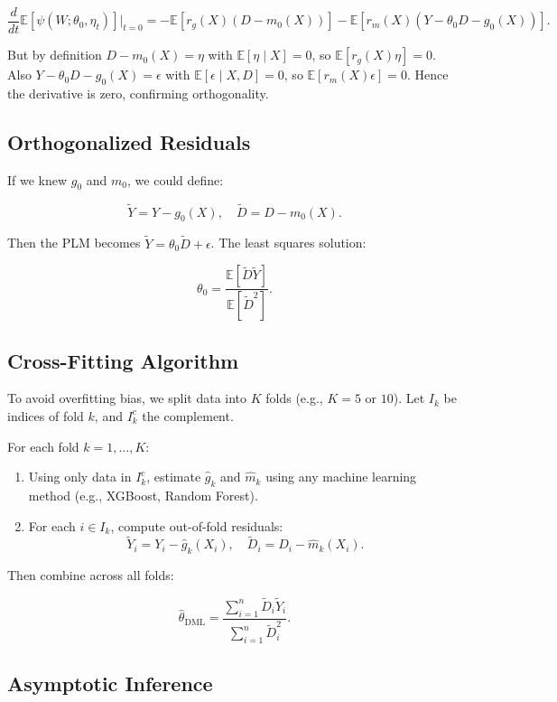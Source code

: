 \documentclass[12pt]{article}
\begin{document}
	\[
	\frac{d}{dt} \mathbb{E}[\psi(W; \theta_0, \eta_t)] \big|_{t=0} = -\mathbb{E}[r_g(X)(D - m_0(X))] - \mathbb{E}[r_m(X)(Y - \theta_0 D - g_0(X))].
	\]
	
	But by definition $D - m_0(X) = \eta$ with $\mathbb{E}[\eta \mid X] = 0$, so $\mathbb{E}[r_g(X) \eta] = 0$. Also $Y - \theta_0 D - g_0(X) = \epsilon$ with $\mathbb{E}[\epsilon \mid X, D] = 0$, so $\mathbb{E}[r_m(X) \epsilon] = 0$. Hence the derivative is zero, confirming orthogonality.
	
	\subsection{Orthogonalized Residuals}
	
	If we knew $g_0$ and $m_0$, we could define:
	
	\[
	\tilde{Y} = Y - g_0(X), \quad \tilde{D} = D - m_0(X).
	\]
	
	Then the PLM becomes $\tilde{Y} = \theta_0 \tilde{D} + \epsilon$. The least squares solution:
	
	\[
	\theta_0 = \frac{\mathbb{E}[\tilde{D} \tilde{Y}]}{\mathbb{E}[\tilde{D}^2]}.
	\]
	
	\subsection{Cross-Fitting Algorithm}
	
	To avoid overfitting bias, we split data into $K$ folds (e.g., $K=5$ or $10$). Let $I_k$ be indices of fold $k$, and $I_k^c$ the complement.
	
	For each fold $k=1,\dots,K$:
	
	\begin{enumerate}
		\item Using only data in $I_k^c$, estimate $\hat{g}_k$ and $\hat{m}_k$ using any machine learning method (e.g., XGBoost, Random Forest).
		\item For each $i \in I_k$, compute out-of-fold residuals:
		\[
		\tilde{Y}_i = Y_i - \hat{g}_k(X_i), \quad \tilde{D}_i = D_i - \hat{m}_k(X_i).
		\]
	\end{enumerate}
	
	Then combine across all folds:
	
	\[
	\hat{\theta}_{\text{DML}} = \frac{\sum_{i=1}^n \tilde{D}_i \tilde{Y}_i}{\sum_{i=1}^n \tilde{D}_i^2}.
	\]
	
	\subsection{Asymptotic Inference}
	
\end{document}
